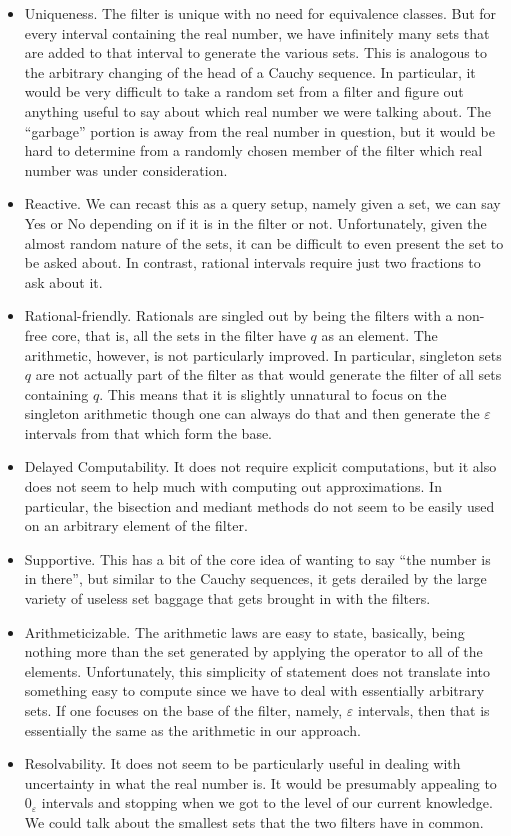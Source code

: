 \documentclass[12pt]{article}
\begin{document}
\begin{itemize}
    \item Uniqueness. The filter is unique with no need for equivalence classes. But for every interval containing the real number, we have infinitely many sets that are added to that interval to generate the various sets. This is analogous to the arbitrary changing of the head of a Cauchy sequence. In particular, it would be very difficult to take a random set from a filter and figure out anything useful to say about which real number we were talking about. The ``garbage'' portion is away from the real number in question, but it would be hard to determine from a randomly chosen member of the filter which real number was under consideration. 
    \item Reactive. We can recast this as a query setup, namely given a set, we can say Yes or No depending on if it is in the filter or not. Unfortunately, given the almost random nature of the sets, it can be difficult to even present the set to be asked about. In contrast, rational intervals require just two fractions to ask about it. 
    \item Rational-friendly. Rationals are singled out by being the filters with a non-free core, that is, all the sets in the filter have $q$ as an element. The arithmetic, however, is not particularly improved. In particular, singleton sets $q$ are not actually part of the filter as that would generate the filter of all sets containing $q$. This means that it is slightly unnatural to focus on the singleton arithmetic though one can always do that and then generate the $\varepsilon$ intervals from that which form the base. 
    \item Delayed Computability. It does not require explicit computations, but it also does not seem to help much with computing out approximations. In particular, the bisection and mediant methods do not seem to be easily used on an arbitrary element of the filter. 
    \item Supportive. This has a bit of the core idea of wanting to say ``the number is in there'', but similar to the Cauchy sequences, it gets derailed by the large variety of useless set baggage that gets brought in with the filters. 
    \item Arithmeticizable. The arithmetic laws are easy to state, basically, being nothing more than the set generated by applying the operator to all of the elements. Unfortunately, this simplicity of statement does not translate into something easy to compute since we have to deal with essentially arbitrary sets. If one focuses on the base of the filter, namely, $\varepsilon$ intervals, then that is essentially the same as the arithmetic in our approach. 
    \item Resolvability. It does not seem to be particularly useful in dealing with uncertainty in what the real number is. It would be presumably appealing to $0_{\varepsilon}$ intervals and stopping when we got to the level of our current knowledge. We could talk about the smallest sets that the two filters have in common. 
\end{itemize}
\end{document}
